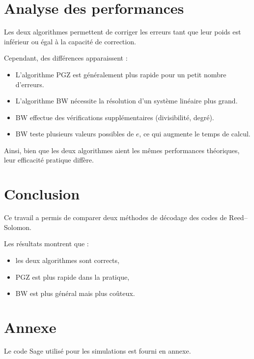 \documentclass[a4paper,11pt]{article}
\begin{document}
\begin{landscape}
\begin{longtable}{ccccccccc}
\end{longtable}
\end{landscape}
\section{Analyse des performances}

Les deux algorithmes permettent de corriger les erreurs tant que leur poids est inférieur ou égal à la capacité de correction.

Cependant, des différences apparaissent :

\begin{itemize}
    \item L'algorithme PGZ est généralement plus rapide pour un petit nombre d'erreurs.
    \item L'algorithme BW nécessite la résolution d’un système linéaire plus grand.
    \item BW effectue des vérifications supplémentaires (divisibilité, degré).
    \item BW teste plusieurs valeurs possibles de $e$, ce qui augmente le temps de calcul.
\end{itemize}

Ainsi, bien que les deux algorithmes aient les mêmes performances théoriques, leur efficacité pratique diffère.

\section{Conclusion}

Ce travail a permis de comparer deux méthodes de décodage des codes de Reed--Solomon.

Les résultats montrent que :
\begin{itemize}
    \item les deux algorithmes sont corrects,
    \item PGZ est plus rapide dans la pratique,
    \item BW est plus général mais plus coûteux.
\end{itemize}

\section*{Annexe}

Le code Sage utilisé pour les simulations est fourni en annexe.
\end{document}
